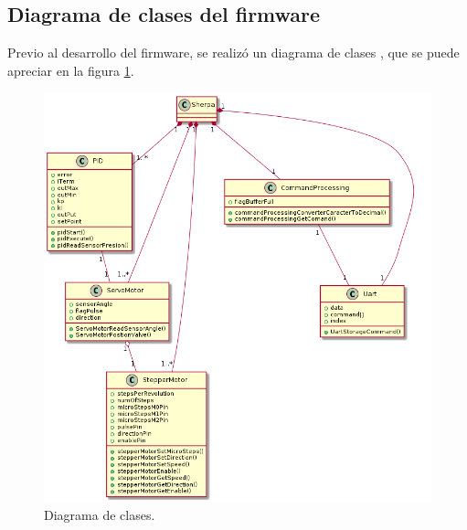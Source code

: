 \subsection{Diagrama de clases del firmware}
\label{subsec:Diagrama de clase}
Previo al desarrollo del firmware, se realizó un diagrama de clases \citep{DIAGRAMADECLASES}, que se puede apreciar en la figura \ref{fig:Diagrama de clase.}. 
\begin{figure}[h]
	\centering
	\includegraphics[scale=.50]{./Figures/DiagramaDeClase-DistribucionDeAguaII.png}
	\caption{Diagrama de clases.}
	\label{fig:Diagrama de clase.}
	\end{figure}
